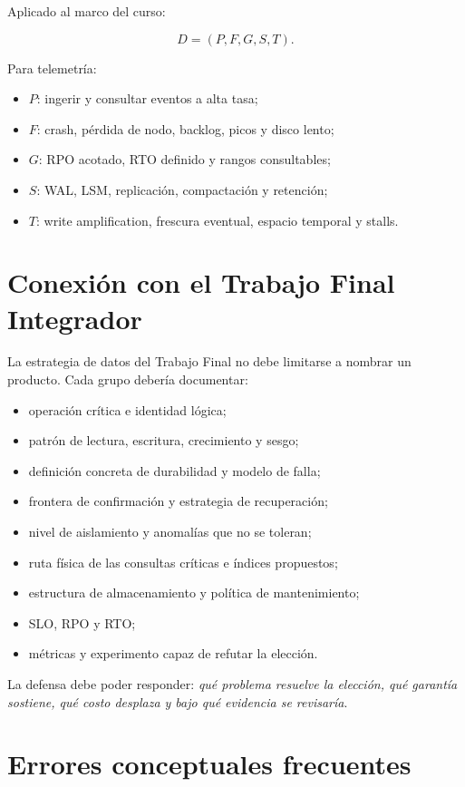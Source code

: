 \documentclass[variant=apuntes,cover=institutional,mode=screen]{ua-engineering-v6-article}
\begin{document}
Aplicado al marco del curso:

\[
D=(P,F,G,S,T).
\]

Para telemetría:

\begin{itemize}
\item $P$: ingerir y consultar eventos a alta tasa;
\item $F$: crash, pérdida de nodo, backlog, picos y disco lento;
\item $G$: RPO acotado, RTO definido y rangos consultables;
\item $S$: WAL, LSM, replicación, compactación y retención;
\item $T$: write amplification, frescura eventual, espacio temporal y stalls.
\end{itemize}

\section{Conexión con el Trabajo Final Integrador}

La estrategia de datos del Trabajo Final no debe limitarse a nombrar un producto. Cada grupo debería documentar:

\begin{itemize}
\item operación crítica e identidad lógica;
\item patrón de lectura, escritura, crecimiento y sesgo;
\item definición concreta de durabilidad y modelo de falla;
\item frontera de confirmación y estrategia de recuperación;
\item nivel de aislamiento y anomalías que no se toleran;
\item ruta física de las consultas críticas e índices propuestos;
\item estructura de almacenamiento y política de mantenimiento;
\item SLO, RPO y RTO;
\item métricas y experimento capaz de refutar la elección.
\end{itemize}

La defensa debe poder responder: \emph{qué problema resuelve la elección, qué garantía sostiene, qué costo desplaza y bajo qué evidencia se revisaría}.

\section{Errores conceptuales frecuentes}
\end{document}
